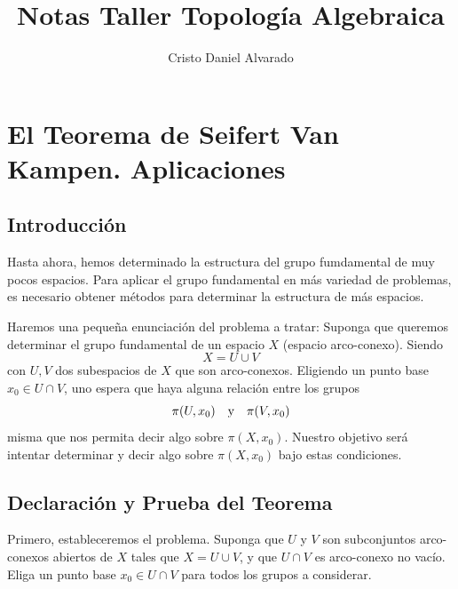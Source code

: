 \documentclass[12pt]{report}
\theoremstyle{largebreak}
\begin{document}
    \setlength{\parskip}{5pt} %
    \setlength{\parindent}{12pt} %
    \title{Notas Taller Topología Algebraica}
    \author{Cristo Daniel Alvarado}
    \maketitle

    \tableofcontents %

    
    \chapter{El Teorema de Seifert Van Kampen. Aplicaciones}
    
    \section{Introducción}
    
    Hasta ahora, hemos determinado la estructura del grupo fumdamental de muy pocos espacios. Para aplicar el grupo fundamental en más variedad de problemas, es necesario obtener métodos para determinar la estructura de más espacios.

    Haremos una pequeña enunciación del problema a tratar: Suponga que queremos determinar el grupo fundamental de un espacio $X$ (espacio arco-conexo). Siendo
    \begin{equation*}
        X=U\cup V
    \end{equation*}
    con $U,V$ dos subespacios de $X$ que son arco-conexos. Eligiendo un punto base $x_0\in U\cap V$, uno espera que haya alguna relación entre los grupos
    \begin{equation*}
        \pi(U,x_0)\quad\textup{y}\quad\pi(V,x_0)
    \end{equation*}
    misma que nos permita decir algo sobre $\pi(X,x_0)$. Nuestro objetivo será intentar determinar y decir algo sobre $\pi(X,x_0)$ bajo estas condiciones.

    \section{Declaración y Prueba del Teorema}

    Primero, estableceremos el problema. Suponga que $U$ y $V$ son subconjuntos arco-conexos abiertos de $X$ tales que $X=U\cup V$, y que $U\cap V$ es arco-conexo no vacío. Eliga un punto base $x_0\in U\cap V$ para todos los grupos a considerar.
\end{document}

